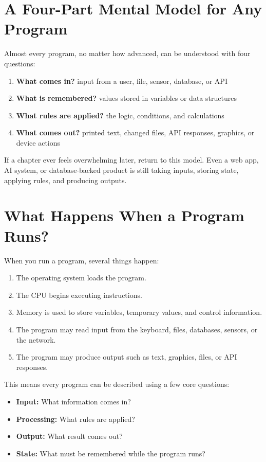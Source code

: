 \documentclass[12pt, a4paper, oneside]{book}
\begin{document}
\section{A Four-Part Mental Model for Any Program}

Almost every program, no matter how advanced, can be understood with four questions:
\begin{enumerate}[leftmargin=2em]
    \item \textbf{What comes in?} input from a user, file, sensor, database, or API
    \item \textbf{What is remembered?} values stored in variables or data structures
    \item \textbf{What rules are applied?} the logic, conditions, and calculations
    \item \textbf{What comes out?} printed text, changed files, API responses, graphics, or device actions
\end{enumerate}

\begin{intuitionbox}
If a chapter ever feels overwhelming later, return to this model. Even a web app, AI system, or database-backed product is still taking inputs, storing state, applying rules, and producing outputs.
\end{intuitionbox}

\section{What Happens When a Program Runs?}

When you run a program, several things happen:
\begin{enumerate}[leftmargin=2em]
    \item The operating system loads the program.
    \item The CPU begins executing instructions.
    \item Memory is used to store variables, temporary values, and control information.
    \item The program may read input from the keyboard, files, databases, sensors, or the network.
    \item The program may produce output such as text, graphics, files, or API responses.
\end{enumerate}

This means every program can be described using a few core questions:
\begin{itemize}[leftmargin=2em]
    \item \textbf{Input:} What information comes in?
    \item \textbf{Processing:} What rules are applied?
    \item \textbf{Output:} What result comes out?
    \item \textbf{State:} What must be remembered while the program runs?
\end{itemize}
\end{document}
